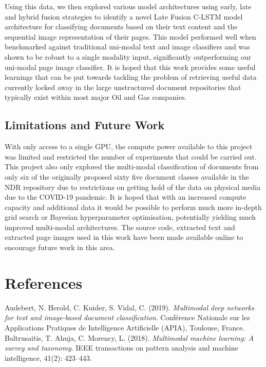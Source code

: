\documentclass[a4paper,12pt]{article}
\begin{document}
Using this data, we then explored various model architectures using early, late and hybrid fusion strategies to identify a novel Late Fusion C-LSTM model architecture for classifying documents based on their text content and the sequential image representation of their pages. This model performed well when benchmarked against traditional uni-modal text and image classifiers and was shown to be robust to a single modality input, significantly outperforming our uni-modal page image classifier. It is hoped that this work provides some useful learnings that can be put towards tackling the problem of retrieving useful data currently locked away in the large unstructured document repositories that typically exist within most major Oil and Gas companies.

\subsection{Limitations and Future Work}
With only access to a single GPU, the compute power available to this project was limited and restricted the number of experiments that could be carried out. This project also only explored the multi-modal classification of documents from only six of the originally proposed sixty five document classes available in the NDR repository due to restrictions on getting hold of the data on physical media due to the COVID-19 pandemic. It is hoped that with an increased compute capacity and additional data it would be possible to perform much more in-depth grid search or Bayesian hyperparameter optimisation, potentially yielding much improved multi-modal architectures. The source code, extracted text and extracted page images used in this work have been made available online to encourage future work in this area.

\section{References}

\noindent Audebert, N. Herold, C. Kuider, S. Vidal, C. (2019). \emph{Multimodal deep networks for text and image-based document classification}. Conférence Nationale sur les Applications Pratiques de Intelligence Artificielle (APIA), Toulouse, France.\\

\noindent Baltrusaitis, T. Ahuja, C. Morency, L. (2018). \emph{Multimodal machine learning: A survey and taxonomy}. IEEE transactions on pattern analysis and machine intelligence, 41(2): 423–443.\\
\end{document}
